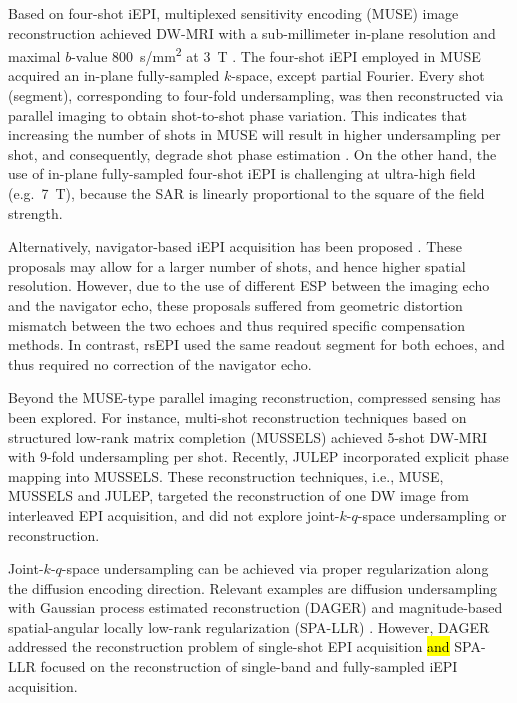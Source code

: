\documentclass[preprint,12pt,authoryear,review]{elsarticle}
\begin{document}
    Based on four-shot iEPI,
    multiplexed sensitivity encoding (MUSE) image reconstruction
    achieved DW-MRI with a sub-millimeter in-plane resolution
    and maximal $b$-value \SI{800}{s/mm^2} at \SI{3}{\tesla}
    \citep{chen_2013_muse}.
    The four-shot iEPI employed in MUSE acquired
    an in-plane fully-sampled $k$-space, except partial Fourier.
    Every shot (segment), corresponding to four-fold undersampling,
    was then reconstructed via parallel imaging
    to obtain shot-to-shot phase variation.
    This indicates that increasing the number of shots in MUSE
    will result in higher undersampling per shot,
    and consequently, degrade shot phase estimation \citep{wu_2017_diff}.
    On the other hand, the use of in-plane fully-sampled four-shot iEPI
    is challenging at ultra-high field (e.g.~\SI{7}{\tesla}),
    because the SAR is linearly proportional
    to the square of the field strength.

    Alternatively, navigator-based iEPI acquisition has been proposed
    \citep{jeong_2013_navims,dai_2017_navi,dai_2018_navi}.
    These proposals may allow for a larger number of shots,
    and hence higher spatial resolution.
    However, due to the use of different ESP
    between the imaging echo and the navigator echo,
    these proposals suffered from geometric distortion mismatch
    between the two echoes and thus required specific compensation methods.
    In contrast, rsEPI \citep{porter_2009_resolve,heidemann_2010_resolve7t}
    used the same readout segment for both echoes,
    and thus required no correction of the navigator echo.

    Beyond the MUSE-type parallel imaging reconstruction,
    compressed sensing \citep{lustig_2007_cs,block_2007_cs}
    has been explored.
    For instance, multi-shot reconstruction techniques
    based on structured low-rank matrix completion (MUSSELS)
    \citep{mani_2017_mussels,bilgic_2019_neatr} achieved
    5-shot DW-MRI with 9-fold undersampling per shot.
    Recently, JULEP \citep{dai_2023_julep}
    incorporated explicit phase mapping into MUSSELS.
    These reconstruction techniques, i.e., MUSE, MUSSELS and JULEP,
    targeted the reconstruction of one DW image
    from interleaved EPI acquisition,
    and did not explore joint-$k$-$q$-space undersampling or reconstruction.

    Joint-$k$-$q$-space undersampling can be achieved
    via proper regularization along the diffusion encoding direction.
    Relevant examples are diffusion undersampling
    with Gaussian process estimated reconstruction (DAGER)
    \citep{wu_2019_dager} and
    magnitude-based spatial-angular locally low-rank regularization
    (SPA-LLR) \citep{hu_2020_spa_llr}.
    However, DAGER addressed the reconstruction problem
    of single-shot EPI acquisition \hl{and} 
    SPA-LLR focused on the reconstruction
    of single-band and fully-sampled iEPI acquisition.
\end{document}

